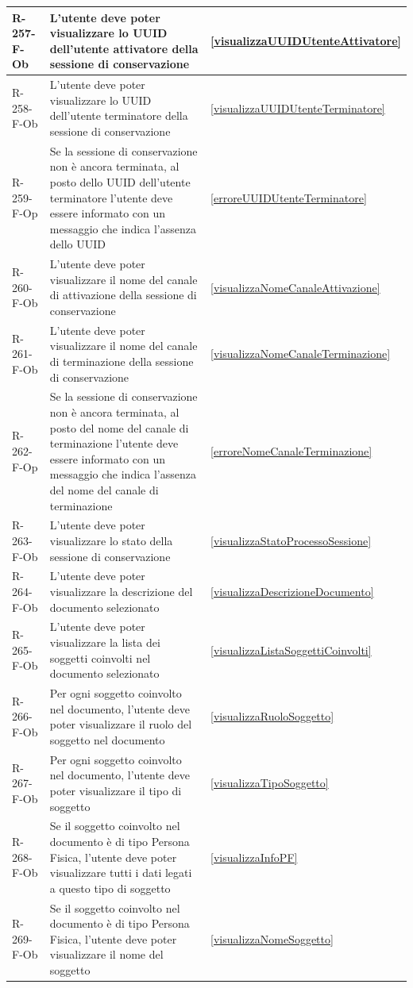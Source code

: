 \begin{longtable}{|p{2.5cm}|p{9.5cm}|p{2.5cm}|}
\hline
R-257-F-Ob & L'utente deve poter visualizzare lo UUID dell'utente attivatore della sessione di conservazione & \ref{visualizzaUUIDUtenteAttivatore} \\
\hline
R-258-F-Ob & L'utente deve poter visualizzare lo UUID dell'utente terminatore della sessione di conservazione & \ref{visualizzaUUIDUtenteTerminatore} \\
\hline
R-259-F-Op & Se la sessione di conservazione non è ancora terminata, al posto dello UUID dell'utente terminatore l'utente deve essere informato con un messaggio che indica l'assenza dello UUID & \ref{erroreUUIDUtenteTerminatore} \\
\hline
R-260-F-Ob & L'utente deve poter visualizzare il nome del canale di attivazione della sessione di conservazione & \ref{visualizzaNomeCanaleAttivazione} \\
\hline
R-261-F-Ob & L'utente deve poter visualizzare il nome del canale di terminazione della sessione di conservazione & \ref{visualizzaNomeCanaleTerminazione} \\
\hline
R-262-F-Op & Se la sessione di conservazione non è ancora terminata, al posto del nome del canale di terminazione l'utente deve essere informato con un messaggio che indica l'assenza del nome del canale di terminazione & \ref{erroreNomeCanaleTerminazione} \\
\hline
R-263-F-Ob & L'utente deve poter visualizzare lo stato della sessione di conservazione & \ref{visualizzaStatoProcessoSessione} \\
\hline
R-264-F-Ob & L'utente deve poter visualizzare la descrizione del documento selezionato & \ref{visualizzaDescrizioneDocumento} \\
\hline
R-265-F-Ob & L'utente deve poter visualizzare la lista dei soggetti coinvolti nel documento selezionato & \ref{visualizzaListaSoggettiCoinvolti} \\
\hline
R-266-F-Ob & Per ogni soggetto coinvolto nel documento, l'utente deve poter visualizzare il ruolo del soggetto nel documento & \ref{visualizzaRuoloSoggetto} \\
\hline
R-267-F-Ob & Per ogni soggetto coinvolto nel documento, l'utente deve poter visualizzare il tipo di soggetto & \ref{visualizzaTipoSoggetto} \\
\hline
R-268-F-Ob & Se il soggetto coinvolto nel documento è di tipo Persona Fisica, l'utente deve poter visualizzare tutti i dati legati a questo tipo di soggetto & \ref{visualizzaInfoPF} \\
\hline
R-269-F-Ob & Se il soggetto coinvolto nel documento è di tipo Persona Fisica, l'utente deve poter visualizzare il nome del soggetto & \ref{visualizzaNomeSoggetto} \\

\end{longtable}
